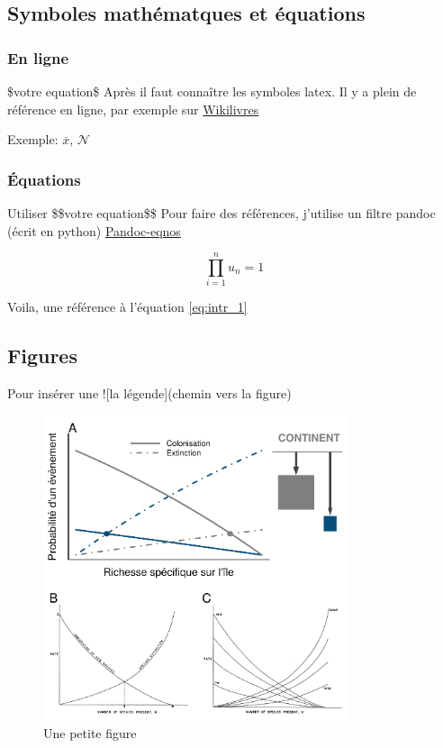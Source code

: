 \subsection*{Symboles mathématques et
équations}\label{symboles-mathuxe9matques-et-uxe9quations}

\subsubsection*{En ligne}\label{en-ligne}

\$votre equation\$ Après il faut connaître les symboles latex. Il y a
plein de référence en ligne, par exemple sur
\href{https://en.wikibooks.org/wiki/LaTeX/Mathematics}{Wikilivres}

Exemple: \(\overline{x}\), \(\mathcal{N}\)

\subsubsection*{Équations}\label{uxe9quations}

Utiliser \$\$votre equation\$\$ Pour faire des références, j'utilise un
filtre pandoc (écrit en python)
\href{https://github.com/tomduck/pandoc-eqnos}{Pandoc-eqnos}

\begin{equation}\prod_{i=1}^nu_n=1\label{eq:intr_1}\end{equation}

Voila, une référence à l'équation \ref{eq:intr_1}

\subsection*{Figures}\label{figures}

Pour insérer une !{[}la légende{]}(chemin vers la figure)

\begin{figure}[htbp]
\centering
\includegraphics[width=0.80000\textwidth]{fig/fig1.pdf}
\caption{Une petite figure\label{fig:intr1}}
\end{figure}

